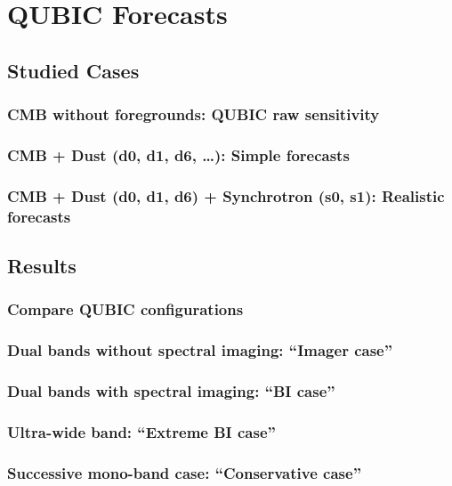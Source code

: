 \documentclass[../../thesis.tex]{subfiles}
\begin{document}
\chapter{QUBIC Forecasts}

\minitoc

\section{Studied Cases}

\subsection{CMB without foregrounds: QUBIC raw sensitivity}

\subsection{CMB + Dust (d0, d1, d6, \dots): Simple forecasts}

\subsection{CMB + Dust (d0, d1, d6) + Synchrotron (s0, s1): Realistic forecasts}

\section{Results}

\subsection{Compare QUBIC configurations}

\subsection{Dual bands without spectral imaging: ``Imager case''}

\subsection{Dual bands with spectral imaging: ``BI case''}

\subsection{Ultra-wide band: ``Extreme BI case''}

\subsection{Successive mono-band case: ``Conservative case''}
\end{document}
